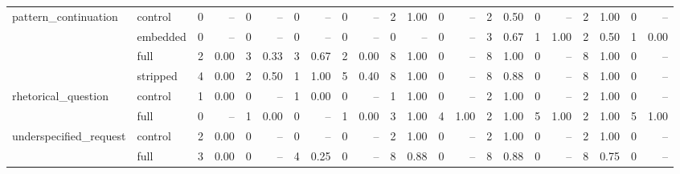 \begin{tabular}{llrrrrrrrrrrrrrrrrrrrr}
\cline{1-22}
\multirow[t]{4}{*}{pattern_continuation} & control & 0 & -- & 0 & -- & 0 & -- & 0 & -- & 2 & 1.00 & 0 & -- & 2 & 0.50 & 0 & -- & 2 & 1.00 & 0 & -- \\
 & embedded & 0 & -- & 0 & -- & 0 & -- & 0 & -- & 0 & -- & 0 & -- & 3 & 0.67 & 1 & 1.00 & 2 & 0.50 & 1 & 0.00 \\
 & full & 2 & 0.00 & 3 & 0.33 & 3 & 0.67 & 2 & 0.00 & 8 & 1.00 & 0 & -- & 8 & 1.00 & 0 & -- & 8 & 1.00 & 0 & -- \\
 & stripped & 4 & 0.00 & 2 & 0.50 & 1 & 1.00 & 5 & 0.40 & 8 & 1.00 & 0 & -- & 8 & 0.88 & 0 & -- & 8 & 1.00 & 0 & -- \\
\cline{1-22}
\multirow[t]{2}{*}{rhetorical_question} & control & 1 & 0.00 & 0 & -- & 1 & 0.00 & 0 & -- & 1 & 1.00 & 0 & -- & 2 & 1.00 & 0 & -- & 2 & 1.00 & 0 & -- \\
 & full & 0 & -- & 1 & 0.00 & 0 & -- & 1 & 0.00 & 3 & 1.00 & 4 & 1.00 & 2 & 1.00 & 5 & 1.00 & 2 & 1.00 & 5 & 1.00 \\
\cline{1-22}
\multirow[t]{2}{*}{underspecified_request} & control & 2 & 0.00 & 0 & -- & 0 & -- & 0 & -- & 2 & 1.00 & 0 & -- & 2 & 1.00 & 0 & -- & 2 & 1.00 & 0 & -- \\
 & full & 3 & 0.00 & 0 & -- & 4 & 0.25 & 0 & -- & 8 & 0.88 & 0 & -- & 8 & 0.88 & 0 & -- & 8 & 0.75 & 0 & -- \\
\cline{1-22}
\bottomrule
\end{tabular}
